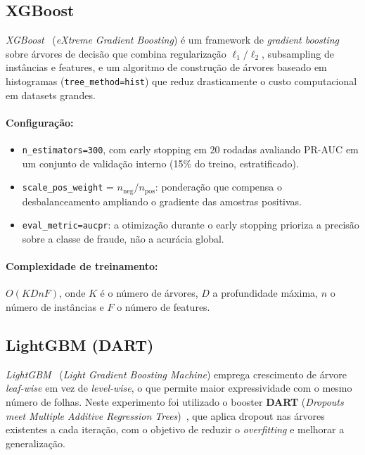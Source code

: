 \documentclass[12pt,a4paper]{article}
\newcommand{\algo}[1]{\textit{#1}}
\begin{document}
\subsection{XGBoost}
\label{sec:xgboost}

\algo{XGBoost}~\cite{chen2016xgboost} (\textit{eXtreme Gradient Boosting}) é
um framework de \textit{gradient boosting} sobre árvores de decisão que combina
regularização $\ell_1/\ell_2$, subsampling de instâncias e features, e um
algoritmo de construção de árvores baseado em histogramas (\texttt{tree\_method=hist})
que reduz drasticamente o custo computacional em datasets grandes.

\paragraph{Configuração:}
\begin{itemize}[nosep]
  \item \texttt{n\_estimators=300}, com early stopping em 20 rodadas avaliando
    PR-AUC em um conjunto de validação interno (15\% do treino, estratificado).
  \item \texttt{scale\_pos\_weight} = $n_\text{neg}/n_\text{pos}$: ponderação
    que compensa o desbalanceamento ampliando o gradiente das amostras positivas.
  \item \texttt{eval\_metric=aucpr}: a otimização durante o early stopping
    prioriza a precisão sobre a classe de fraude, não a acurácia global.
\end{itemize}

\paragraph{Complexidade de treinamento:} $O(KDnF)$, onde $K$ é o número de
árvores, $D$ a profundidade máxima, $n$ o número de instâncias e $F$ o número
de features.

\subsection{LightGBM (DART)}
\label{sec:lightgbm}

\algo{LightGBM}~\cite{ke2017lightgbm} (\textit{Light Gradient Boosting Machine})
emprega crescimento de árvore \textit{leaf-wise} em vez de \textit{level-wise},
o que permite maior expressividade com o mesmo número de folhas. Neste
experimento foi utilizado o booster \textbf{DART} (\textit{Dropouts meet
Multiple Additive Regression Trees})~\cite{rashmi2015dart}, que aplica dropout
nas árvores existentes a cada iteração, com o objetivo de reduzir o
\textit{overfitting} e melhorar a generalização.
\end{document}
